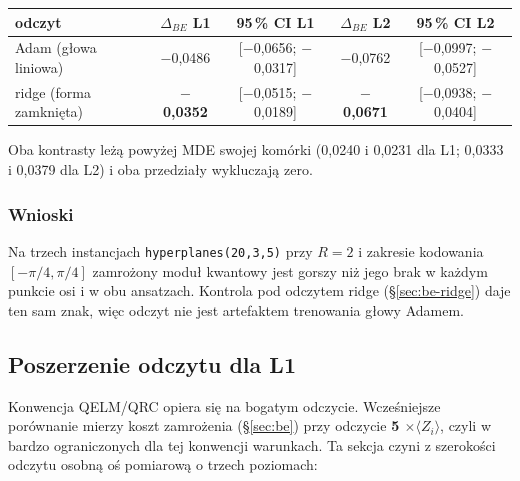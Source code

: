 \documentclass[11pt, a4paper]{article}
\begin{document}
\begin{table}[H]
\centering
\renewcommand{\arraystretch}{1.3}
\begin{tabular}{lcccc}
\toprule
\textbf{odczyt} & $\Delta_{BE}$ \textbf{L1} & \textbf{95\,\% CI L1} & $\Delta_{BE}$ \textbf{L2} & \textbf{95\,\% CI L2} \\
\midrule
Adam (głowa liniowa) & $-$0,0486 & [$-$0,0656; $-$0,0317] & $-$0,0762 & [$-$0,0997; $-$0,0527] \\
ridge (forma zamknięta) & \textbf{$-$0,0352} & [$-$0,0515; $-$0,0189] & \textbf{$-$0,0671} & [$-$0,0938; $-$0,0404] \\
\bottomrule
\end{tabular}
\begin{minipage}{\textwidth}
\footnotesize Oba kontrasty leżą powyżej MDE swojej komórki (0,0240 i 0,0231 dla L1; 0,0333 i 0,0379 dla L2) i oba przedziały wykluczają zero.
\end{minipage}
\end{table}

\subsubsection{Wnioski}
Na trzech instancjach \texttt{hyperplanes(20,3,5)} przy $R=2$ i zakresie kodowania $[-\pi/4,\pi/4]$ zamrożony moduł kwantowy jest gorszy niż jego brak w każdym punkcie osi i w obu ansatzach. Kontrola pod odczytem ridge (\S\ref{sec:be-ridge}) daje ten sam znak, więc odczyt nie jest artefaktem trenowania głowy Adamem.

\subsection{Poszerzenie odczytu dla L1}\label{sec:korelatory}

Konwencja QELM/QRC opiera się na bogatym odczycie. Wcześniejsze porównanie mierzy koszt zamrożenia (\S\ref{sec:be}) przy odczycie \textbf{5 $\times \langle Z_i \rangle$}, czyli w bardzo ograniczonych dla tej konwencji warunkach. Ta sekcja czyni z szerokości odczytu osobną oś pomiarową o trzech poziomach:
\end{document}
